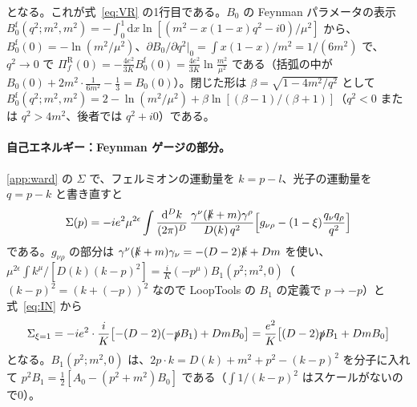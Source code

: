 \documentclass[a4paper,10pt]{ltjsarticle}
\newcommand{\dd}{\mathrm{d}}
\begin{document}
となる。これが式~\eqref{eq:VR} の1行目である。$B_0$ の Feynman パラメータの表示 $B_0^{\mathrm f}(q^2;m^2,m^2)=-\int_0^1\dd x\ln[(m^2-x(1-x)q^2-i0)/\mu^2]$ から、$B_0^{\mathrm f}(0)=-\ln(m^2/\mu^2)$、$\partial B_0/\partial q^2|_0=\int x(1-x)/m^2=1/(6m^2)$ で、$q^2\to0$ で $\Pi_f^{\mathrm R}(0)=-\frac{4e^2}{3K}B_0^{\mathrm f}(0)=\frac{4e^2}{3K}\ln\frac{m^2}{\mu^2}$ である（括弧の中が $B_0(0)+2m^2\cdot\frac{1}{6m^2}-\frac13=B_0(0)$）。閉じた形は $\beta=\sqrt{1-4m^2/q^2}$ として $B_0^{\mathrm f}(q^2;m^2,m^2)=2-\ln(m^2/\mu^2)+\beta\ln[(\beta-1)/(\beta+1)]$（$q^2<0$ または $q^2>4m^2$、後者では $q^2+i0$）である。

\paragraph{自己エネルギー：Feynman ゲージの部分。}\ref{app:ward} の $\Sigma$ で、フェルミオンの運動量を $k=p-l$、光子の運動量を $q=p-k$ と書き直すと
\begin{equation*}
\Sigma(p)=-ie^2\mu^{2\epsilon}\int\frac{\dd^Dk}{(2\pi)^D}\,\frac{\gamma^\nu(\slashed k+m)\gamma^\rho}{D(k)\,q^2}\Bigl[g_{\nu\rho}-(1-\xi)\frac{q_\nu q_\rho}{q^2}\Bigr]
\end{equation*}
である。$g_{\nu\rho}$ の部分は $\gamma^\nu(\slashed k+m)\gamma_\nu=-(D-2)\slashed k+Dm$ を使い、$\mu^{2\epsilon}\int k^\mu/[D(k)(k-p)^2]=\frac iK(-p^\mu)B_1(p^2;m^2,0)$（$(k-p)^2=(k+(-p))^2$ なので LoopTools の $B_1$ の定義で $p\to-p$）と式~\eqref{eq:IN} から
\begin{equation*}
\Sigma_{\xi=1}=-ie^2\cdot\frac iK\bigl[-(D-2)(-\slashed pB_1)+DmB_0\bigr]=\frac{e^2}{K}\bigl[(D-2)\slashed pB_1+DmB_0\bigr]
\end{equation*}
となる。$B_1(p^2;m^2,0)$ は、$2p\cdot k=D(k)+m^2+p^2-(k-p)^2$ を分子に入れて $p^2B_1=\frac12[A_0-(p^2+m^2)B_0]$ である（$\int1/(k-p)^2$ はスケールがないので0）。
\end{document}
